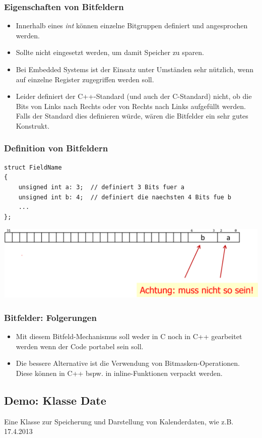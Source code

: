 \subsubsection{Eigenschaften von Bitfeldern}
\begin{itemize}
	\item Innerhalb eines \emph{int} können einzelne Bitgruppen definiert und angesprochen werden.
	\item Sollte nicht eingesetzt werden, um damit Speicher zu sparen.
	\item Bei Embedded Systems ist der Einsatz unter Umständen sehr nützlich, wenn auf einzelne Register zugegriffen werden soll.
	\item[\-]\begin{achtung}
		Leider definiert der C++-Standard (und auch der C-Standard) nicht, ob die Bits von Links nach Rechts oder von Rechts nach Links aufgefüllt werden. Falls der Standard dies definieren würde, wären die Bitfelder ein sehr gutes Konstrukt.
	\end{achtung}
\end{itemize}

\subsubsection{Definition von Bitfeldern}
\vspace{-\baselineskip}
\begin{minipage}{\linewidth}
\begin{lstlisting}
struct FieldName
{
	unsigned int a: 3;	// definiert 3 Bits fuer a
	unsigned int b: 4;	// definiert die naechsten 4 Bits fue b
	...
};
\end{lstlisting}
\end{minipage}
\begin{minipage}{0.8\linewidth}
\includegraphics[width=\linewidth]{images/bitfelder.png}
\end{minipage}

\subsubsection{Bitfelder: Folgerungen}
\begin{itemize}
	\item Mit diesem Bitfeld-Mechanismus soll weder in C noch in C++ gearbeitet werden wenn der Code portabel sein soll.
	\item Die bessere Alternative ist die Verwendung von Bitmasken-Operationen. Diese können in C++ bspw. in inline-Funktionen verpackt werden.
\end{itemize}


\subsection{Demo: Klasse Date}
Eine Klasse zur Speicherung und Darstellung von Kalenderdaten, wie z.B. 17.4.2013





